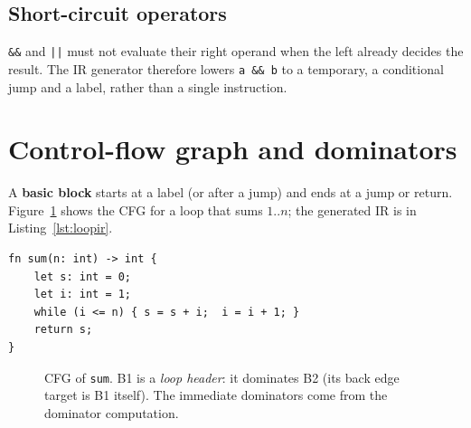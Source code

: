 \subsection{Short-circuit operators}
\verb+&&+ and \verb+||+ must not evaluate their right operand when the left already decides the result. The IR generator therefore lowers \verb|a && b| to a temporary, a conditional jump and a label, rather than a single instruction.

\section{Control-flow graph and dominators}
A \textbf{basic block} starts at a label (or after a jump) and ends at a jump or return. Figure~\ref{fig:cfg} shows the CFG for a loop that sums $1..n$; the generated IR is in Listing~\ref{lst:loopir}.

\begin{lstlisting}[language=nova,caption={The loop example.},label={lst:loopsrc}]
fn sum(n: int) -> int {
    let s: int = 0;
    let i: int = 1;
    while (i <= n) { s = s + i;  i = i + 1; }
    return s;
}
\end{lstlisting}
\begin{figure}[H]\centering\begin{minipage}{0.7\textwidth}
\begingroup{}\endgroup
\end{minipage}\end{figure}

\begin{figure}[H]\centering
{}
\caption{CFG of \texttt{sum}. B1 is a \emph{loop header}: it dominates B2 (its back edge target is B1 itself). The immediate dominators come from the dominator computation.}\label{fig:cfg}
\end{figure}

